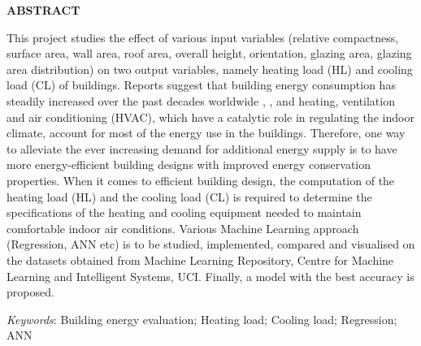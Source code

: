 \thispagestyle{plain}
\begin{center}
\textbf{\textbf{\fontsize{16pt}{24pt}\selectfont ABSTRACT}}
\end{center}

\vspace{0.3cm}
\fontsize{12pt}{18pt}\selectfont This project studies the effect of various input variables
(relative compactness, surface area, wall area, roof area, overall height, orientation, glazing area, glazing area distribution) on two output variables, namely heating load (HL) and cooling load (CL) of buildings. Reports suggest that building energy consumption has
steadily increased over the past decades worldwide \cite{perez2008pout}, \cite{cai2009ren}, and heating, ventilation and air conditioning
(HVAC), which have a catalytic role in regulating the indoor climate, account for most of the energy use in
the buildings. Therefore, one way to alleviate the ever increasing demand for additional energy supply is to
have more energy-efficient building designs with improved energy conservation properties. When it comes
to efficient building design, the computation of the heating load (HL) and the cooling load (CL) is required to
determine the specifications of the heating and cooling equipment needed to maintain comfortable indoor air
conditions.
Various Machine Learning approach (Regression, ANN etc) is to be studied, implemented,
compared and visualised \cite{Hunter:2007} on the datasets obtained from Machine Learning Repository, Centre for Machine Learning and
Intelligent Systems, UCI. Finally, a model with the best accuracy is proposed.

\textit{Keywords}: Building energy evaluation; Heating load; Cooling load; Regression; ANN

\newpage
